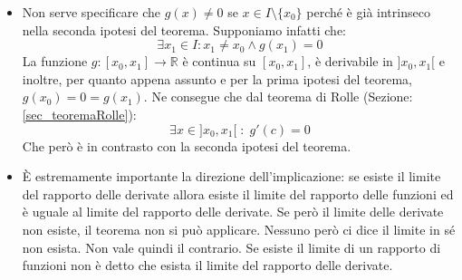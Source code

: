 \begin{itemize}
	\item Non serve specificare che $g(x) \neq 0$ se $x \in I\setminus \{x_0\}$ perché è già intrinseco nella seconda ipotesi del teorema. Supponiamo infatti che:
		\begin{equation*}
			\exists x_1 \in I : x_1 \neq x_0 \land g(x_1) = 0
		\end{equation*}
		La funzione $g:[x_0, x_1] \to \mathbb{R}$ è continua su $[x_0, x_1]$, è derivabile in $]x_0,x_1[$ e inoltre, per quanto appena assunto e per la prima ipotesi del teorema, $g(x_0) = 0 = g(x_1)$. Ne consegue che dal teorema di Rolle (Sezione: \ref{sec_teoremaRolle}):
		\begin{equation*}
			\exists x \in ]x_0, x_1[ \; : \; g'(c) = 0
		\end{equation*}
		Che però è in contrasto con la seconda ipotesi del teorema.

	\item È estremamente importante la direzione dell'implicazione: se esiste il limite del rapporto delle derivate allora esiste il limite del rapporto delle funzioni ed è uguale al limite del rapporto delle derivate. Se però il limite delle derivate non esiste, il teorema non si può applicare. Nessuno però ci dice il limite in sé non esista. Non vale quindi il contrario. Se esiste il limite di un rapporto di funzioni non è detto che esista il limite del rapporto delle derivate.


\end{itemize}

